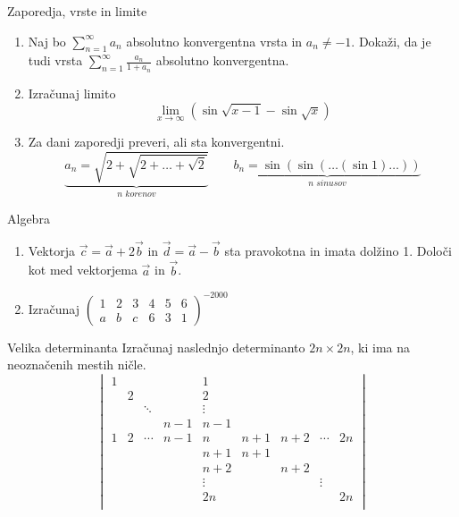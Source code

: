 \newcommand{\ZZ}{\mathbb{Z}}
\newcommand{\RR}{\mathbb{R}}
\newcommand{\CC}{\mathbb{C}}
\begin{frame}{Zaporedja, vrste in limite}
	\begin{enumerate}
		\item 
		Naj bo $\sum_{n=1}^{\infty} a_n$ absolutno konvergentna vrsta in $a_n \ne -1$.
		Dokaži, da je tudi vrsta $\sum_{n=1}^\infty \frac{a_n}{1+a_n}$
		absolutno konvergentna.

		\item
		Izračunaj limito
		\[ \lim_{x\to\infty} (\sin\sqrt{x-1}-\sin\sqrt{x}) \]

		\item
		Za dani zaporedji preveri, ali sta konvergentni.
		$$
		\underbrace{a_n = \sqrt{2+\sqrt{2+\dots+\sqrt{2}}}}_{\textit{n korenov}} \qquad \underbrace{b_n = \sin(\sin(\dots(\sin 1)\dots)) }_{\textit{n sinusov}}
		$$
	\end{enumerate}
\end{frame}

\begin{frame}{Algebra}
	\begin{enumerate}
		\item
		Vektorja $\vec{c} = \vec{a} + 2\vec{b}$ in $\vec{d} = \vec{a} - \vec{b}$
		sta pravokotna in imata dolžino 1. Določi kot med vektorjema $\vec{a}$ in $\vec{b}$.
		\item 
		Izračunaj
		\(
        \begin{pmatrix}
			1 & 2 & 3 & 4 & 5 & 6\\
			a & b & c & 6 & 3 & 1
			\end{pmatrix}^{-2000}\)
		
	\end{enumerate}
\end{frame}

\begin{frame}{Velika determinanta}
	Izračunaj naslednjo determinanto $2n \times 2n$, ki ima na neoznačenih mestih ničle.
\[
\begin{vmatrix}
1 &   &     &     & 1   &     &     &     &     \\
  & 2 &     &     & 2   &     &     &     &     \\
  &   & \ddots &     & \vdots &     &     &     &     \\
  &   &     & n-1 & n-1 &     &     &     &     \\
1 & 2 & \cdots & n-1 & n   & n+1 & n+2 & \cdots & 2n \\
  &   &     &     & n+1 & n+1 &     &     &     \\
  &   &     &     & n+2 &     & n+2 &     &     \\
  &   &     &     & \vdots &     &     & \vdots &     \\
  &   &     &     & 2n  &     &     &     & 2n \\
\end{vmatrix}
\]


\end{frame}

